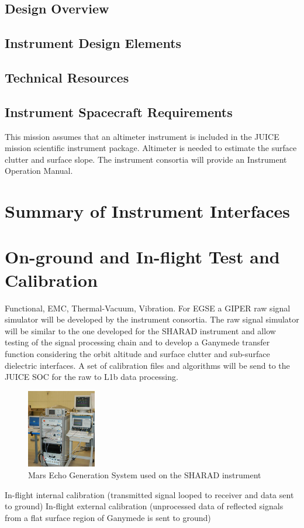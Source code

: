\subsection{Design Overview}
\subsection{Instrument Design Elements}
\subsection{Technical Resources}
\subsection{Instrument Spacecraft Requirements}
This mission assumes that an altimeter instrument is included in the JUICE mission scientific instrument package. Altimeter is needed to estimate the surface clutter and surface slope.
%
The instrument consortia will provide an Instrument Operation Manual.
%
\section{Summary of Instrument Interfaces}
%
\section{On-ground and In-flight Test and Calibration}
%
Functional, EMC, Thermal-Vacuum, Vibration.
%
%
For \ac{EGSE} a \ac{GIPER} raw signal simulator will be developed by the instrument consortia. The raw signal simulator will be similar to the one developed for the \ac{SHARAD} instrument\cite{Giovanni} and allow testing of the signal processing chain and to develop a Ganymede transfer function considering the orbit altitude and surface clutter and sub-surface dielectric interfaces. 
%
%
A set of calibration files and algorithms will be send to the JUICE \ac{SOC} for the raw to L1b data processing.
\begin{figure}
\centering
\includegraphics[width=0.27\textwidth]{figures/MEGS}
\caption[caption]{Mars Echo Generation System used on the SHARAD instrument\cite{MEGS}}
\label{fig:MEGS}
\end{figure}
%
%
In-flight internal calibration (transmitted signal looped to receiver and data sent to ground)
In-flight external calibration (unprocessed data of reflected signals from a flat surface region of Ganymede is sent to ground)
%
%
